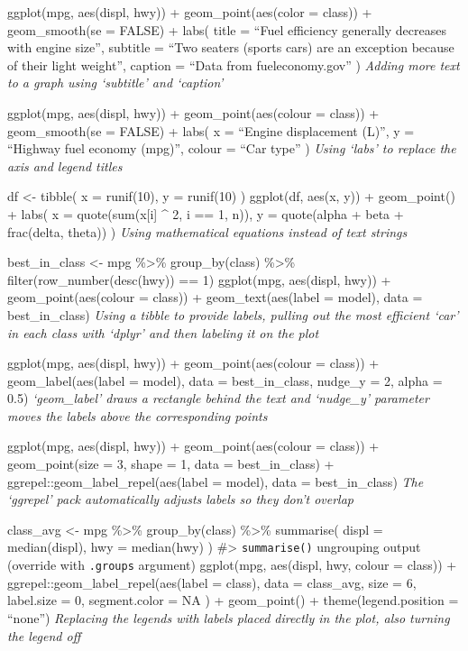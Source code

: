 \documentclass[
]{article}
\begin{document}
ggplot(mpg, aes(displ, hwy)) + geom\_point(aes(color = class)) +
geom\_smooth(se = FALSE) + labs( title = ``Fuel efficiency generally
decreases with engine size'', subtitle = ``Two seaters (sports cars) are
an exception because of their light weight'', caption = ``Data from
fueleconomy.gov'' ) \emph{Adding more text to a graph using `subtitle'
and `caption'}

ggplot(mpg, aes(displ, hwy)) + geom\_point(aes(colour = class)) +
geom\_smooth(se = FALSE) + labs( x = ``Engine displacement (L)'', y =
``Highway fuel economy (mpg)'', colour = ``Car type'' ) \emph{Using
`labs' to replace the axis and legend titles}

df \textless- tibble( x = runif(10), y = runif(10) ) ggplot(df, aes(x,
y)) + geom\_point() + labs( x = quote(sum(x{[}i{]} \^{} 2, i == 1, n)),
y = quote(alpha + beta + frac(delta, theta)) ) \emph{Using mathematical
equations instead of text strings}

best\_in\_class \textless- mpg \%\textgreater\% group\_by(class)
\%\textgreater\% filter(row\_number(desc(hwy)) == 1) ggplot(mpg,
aes(displ, hwy)) + geom\_point(aes(colour = class)) +
geom\_text(aes(label = model), data = best\_in\_class) \emph{Using a
tibble to provide labels, pulling out the most efficient `car' in each
class with `dplyr' and then labeling it on the plot}

ggplot(mpg, aes(displ, hwy)) + geom\_point(aes(colour = class)) +
geom\_label(aes(label = model), data = best\_in\_class, nudge\_y = 2,
alpha = 0.5) \emph{`geom\_label' draws a rectangle behind the text and
`nudge\_y' parameter moves the labels above the corresponding points}

ggplot(mpg, aes(displ, hwy)) + geom\_point(aes(colour = class)) +
geom\_point(size = 3, shape = 1, data = best\_in\_class) +
ggrepel::geom\_label\_repel(aes(label = model), data = best\_in\_class)
\emph{The `ggrepel' pack automatically adjusts labels so they don't
overlap}

class\_avg \textless- mpg \%\textgreater\% group\_by(class)
\%\textgreater\% summarise( displ = median(displ), hwy = median(hwy) )
\#\textgreater{} \texttt{summarise()} ungrouping output (override with
\texttt{.groups} argument) ggplot(mpg, aes(displ, hwy, colour = class))
+ ggrepel::geom\_label\_repel(aes(label = class), data = class\_avg,
size = 6, label.size = 0, segment.color = NA ) + geom\_point() +
theme(legend.position = ``none'') \emph{Replacing the legends with
labels placed directly in the plot, also turning the legend off}
\end{document}
